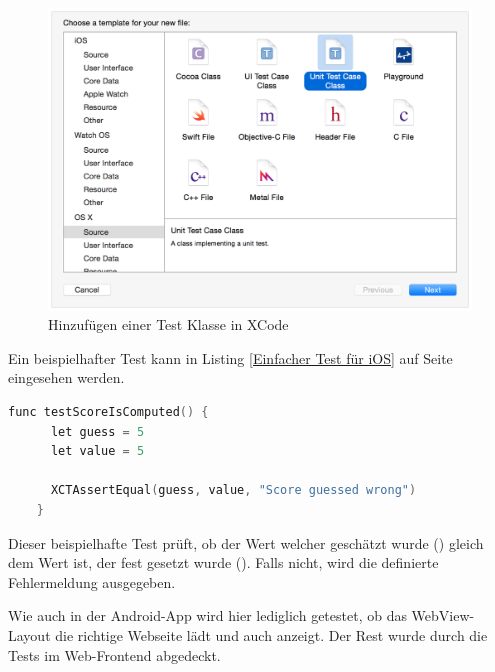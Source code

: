 \begin{figure}[h]
  \centering
    \includegraphics[scale=0.5]{images/kapitel_5/xcode_createtest.png}
  \caption{Hinzufügen einer Test Klasse in XCode}
  \label{fig:xcode_createtest}
\end{figure}

Ein beispielhafter Test kann in Listing \ref{Einfacher Test für iOS} auf Seite \pageref{Einfacher Test für iOS} eingesehen werden.

\begin{lstlisting}[language=c, caption=Einfacher Test für iOS, label=Einfacher Test für iOS]
    func testScoreIsComputed() {
      let guess = 5
      let value = 5

      XCTAssertEqual(guess, value, "Score guessed wrong")
    }
\end{lstlisting}

Dieser beispielhafte Test prüft, ob der Wert welcher geschätzt wurde () gleich dem Wert ist, der fest gesetzt
wurde (). Falls nicht, wird die definierte Fehlermeldung ausgegeben.

Wie auch in der Android-App wird hier lediglich getestet, ob das WebView-Layout die richtige Webseite lädt und auch
anzeigt. Der Rest wurde durch die Tests im Web-Frontend abgedeckt.
